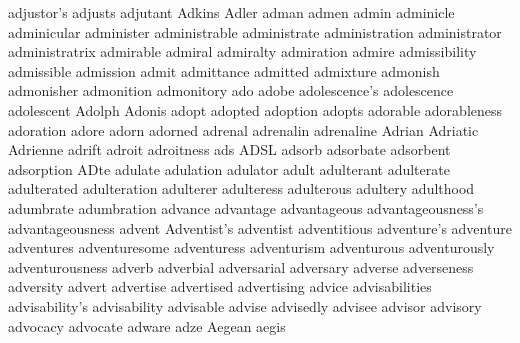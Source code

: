 adjustor's adjusts adjutant Adkins Adler adman admen admin adminicle adminicular administer administrable administrate administration administrator administratrix admirable admiral admiralty admiration admire admissibility admissible admission admit admittance admitted admixture admonish admonisher admonition admonitory ado adobe adolescence's adolescence adolescent Adolph Adonis adopt adopted adoption adopts adorable adorableness adoration adore adorn adorned adrenal adrenalin adrenaline Adrian Adriatic Adrienne adrift adroit adroitness ads ADSL adsorb adsorbate adsorbent adsorption ADte adulate adulation adulator adult adulterant adulterate adulterated adulteration adulterer adulteress adulterous adultery adulthood adumbrate adumbration advance advantage advantageous advantageousness's advantageousness advent Adventist's adventist adventitious adventure's adventure adventures adventuresome adventuress adventurism adventurous adventurously adventurousness adverb adverbial adversarial adversary adverse adverseness adversity advert advertise advertised advertising advice advisabilities advisability's advisability advisable advise advisedly advisee advisor advisory advocacy advocate adware adze Aegean aegis 
